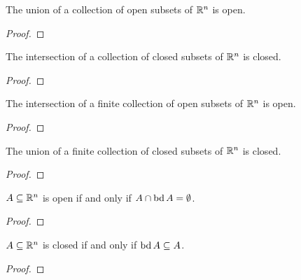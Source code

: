 \documentclass[letterpaper, twoside, 12pt]{book}
\begin{document}
\begin{proposition}[10.17.i]
  The union of a collection of open subsets of \(\mathbb R^n\) is open.
\end{proposition}
\begin{proof}

\end{proof}

\begin{proposition}[10.17.ii]
  The intersection of a collection of closed subsets of \(\mathbb R^n\) is closed.
\end{proposition}
\begin{proof}

\end{proof}

\begin{proposition}[10.18.i]
  The intersection of a finite collection of
  open subsets of \(\mathbb R^n\) is open.
\end{proposition}
\begin{proof}

\end{proof}

\begin{proposition}[10.18.ii]
  The union of a finite collection of
  closed subsets of \(\mathbb R^n\) is closed.
\end{proposition}
\begin{proof}

\end{proof}

\begin{proposition}[10.19.i]
  \(A\subseteq\mathbb R^n\) is open if and only if \(A\cap\operatorname{bd} A=\emptyset\).
\end{proposition}
\begin{proof}

\end{proof}

\begin{proposition}[10.19.ii]
  \(A\subseteq\mathbb R^n\) is closed if and only if \(\operatorname{bd} A\subseteq A\).
\end{proposition}
\begin{proof}

\end{proof}
\end{document}
